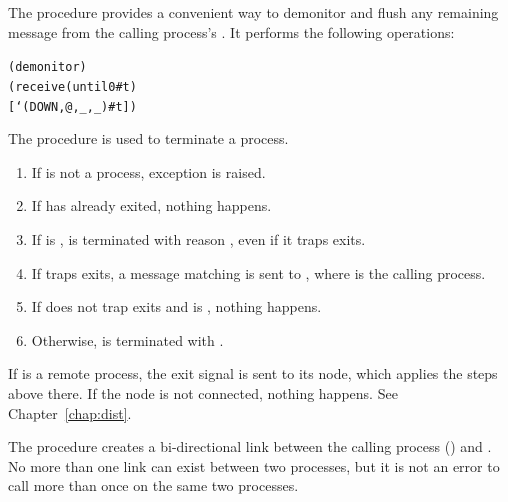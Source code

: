 The  procedure provides a convenient way to
demonitor and flush any remaining  message from the
calling process's . It performs the following operations:
\antipar\begin{alltt}
(demonitor )
(receive (until 0 #t)
  [`(DOWN ,@ ,_ ,_) #t])
\end{alltt}

\begin{procedure}
\end{procedure}
\returns{} 

The  procedure is used to terminate a process.
\begin{enumerate}
\item If  is not a process, exception  is raised.
\item If  has already exited, nothing happens.
\item If  is ,  is terminated
  with reason , even if it traps exits.
\item If  traps exits, a message matching  is sent to , where  is the
  calling process.
\item If  does not trap exits and  is
  , nothing happens.
\item Otherwise,  is terminated with .
\end{enumerate}

If  is a remote process, the exit signal is sent to its
node, which applies the steps above there. If the node is not
connected, nothing happens. See Chapter~\ref{chap:dist}.

\begin{procedure}
\end{procedure}
\returns{} 

The  procedure creates a bi-directional link between the
calling process () and . No more than one link
can exist between two processes, but it is not an error to call
 more than once on the same two processes.

